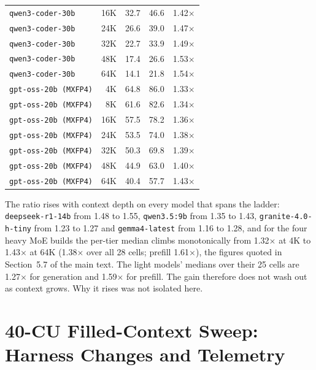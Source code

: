 \documentclass[11pt,a4paper]{article}
\begin{document}
\begin{table}[h]
\begin{tabular}{@{}lrrrr@{}}
\texttt{qwen3-coder-30b} & 16K & 32.7 & 46.6 & 1.42$\times$ \\
\texttt{qwen3-coder-30b} & 24K & 26.6 & 39.0 & 1.47$\times$ \\
\texttt{qwen3-coder-30b} & 32K & 22.7 & 33.9 & 1.49$\times$ \\
\texttt{qwen3-coder-30b} & 48K & 17.4 & 26.6 & 1.53$\times$ \\
\texttt{qwen3-coder-30b} & 64K & 14.1 & 21.8 & 1.54$\times$ \\
\texttt{gpt-oss-20b (MXFP4)} & 4K & 64.8 & 86.0 & 1.33$\times$ \\
\texttt{gpt-oss-20b (MXFP4)} & 8K & 61.6 & 82.6 & 1.34$\times$ \\
\texttt{gpt-oss-20b (MXFP4)} & 16K & 57.5 & 78.2 & 1.36$\times$ \\
\texttt{gpt-oss-20b (MXFP4)} & 24K & 53.5 & 74.0 & 1.38$\times$ \\
\texttt{gpt-oss-20b (MXFP4)} & 32K & 50.3 & 69.8 & 1.39$\times$ \\
\texttt{gpt-oss-20b (MXFP4)} & 48K & 44.9 & 63.0 & 1.40$\times$ \\
\texttt{gpt-oss-20b (MXFP4)} & 64K & 40.4 & 57.7 & 1.43$\times$ \\
\bottomrule
\end{tabular}
\end{table}

The ratio rises with context depth on every model that spans the
ladder: \texttt{deepseek-r1-14b} from 1.48 to 1.55, \texttt{qwen3.5:9b}
from 1.35 to 1.43, \texttt{granite-4.0-h-tiny} from 1.23 to 1.27 and
\texttt{gemma4-latest} from 1.16 to 1.28, and for the four heavy MoE
builds the per-tier median climbs monotonically from 1.32$\times$ at 4K
to 1.43$\times$ at 64K (1.38$\times$ over all 28 cells; prefill
1.61$\times$), the figures quoted in Section~5.7 of the main text.  The
light models' medians over their 25 cells are 1.27$\times$ for
generation and 1.59$\times$ for prefill.  The gain therefore does not
wash out as context grows.  Why it rises was not isolated here.

\section{40-CU Filled-Context Sweep: Harness Changes and Telemetry}
\end{document}
